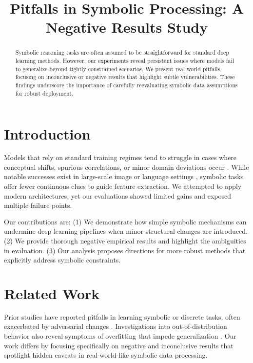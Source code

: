 \documentclass{article}
\title{\vspace{-1em}Pitfalls in Symbolic Processing: A Negative Results Study\vspace{-0.7em}}
\date{}
\begin{document}
\maketitle

\begin{abstract}
Symbolic reasoning tasks are often assumed to be straightforward for standard deep learning methods. However, our experiments reveal persistent issues where models fail to generalize beyond tightly constrained scenarios. We present real-world pitfalls, focusing on inconclusive or negative results that highlight subtle vulnerabilities. These findings underscore the importance of carefully reevaluating symbolic data assumptions for robust deployment.
\end{abstract}

\section{Introduction}
Models that rely on standard training regimes tend to struggle in cases where conceptual shifts, spurious correlations, or minor domain deviations occur \cite{arjovsky2019invariant,lee2020rethinking}. While notable successes exist in large-scale image or language settings \cite{krizhevsky2012imagenet}, symbolic tasks offer fewer continuous clues to guide feature extraction. We attempted to apply modern architectures, yet our evaluations showed limited gains and exposed multiple failure points.

Our contributions are:
(1) We demonstrate how simple symbolic mechanisms can undermine deep learning pipelines when minor structural changes are introduced. (2) We provide thorough negative empirical results and highlight the ambiguities in evaluation. (3) Our analysis proposes directions for more robust methods that explicitly address symbolic constraints.

\section{Related Work}
Prior studies have reported pitfalls in learning symbolic or discrete tasks, often exacerbated by adversarial changes \cite{goodfellow2014explaining,smith2021a}. Investigations into out-of-distribution behavior also reveal symptoms of overfitting that impede generalization \cite{arjovsky2019invariant}. Our work differs by focusing specifically on negative and inconclusive results that spotlight hidden caveats in real-world-like symbolic data processing.
\end{document}
